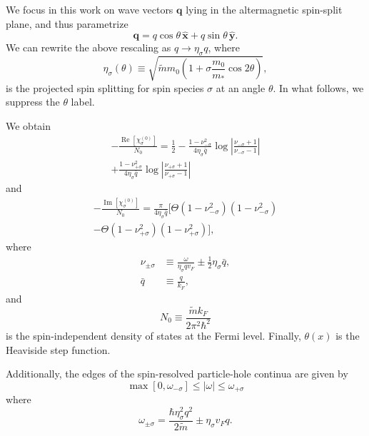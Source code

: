 \documentclass[aps,prb,reprint,twocolumns,superscriptaddress,nofootinbib]{revtex4-2}
\DeclareMathOperator{\Imm}{Im}
\DeclareMathOperator{\Ree}{Re}
\newcommand{\mdos}{\tilde{m}}
\newcommand{\kF}{k_{F}}
\begin{document}
	
	We focus in this work on wave vectors $\bm q$ lying in the altermagnetic spin-split plane, and thus parametrize
	\begin{equation}
		\bm q = q\cos\theta\,\hat{\bm x} + q\sin\theta\,\hat{\bm y}.
	\end{equation}
	We can  rewrite the above rescaling as $q\rightarrow \eta_\sigma q$, where
	\begin{equation}
		\eta_{\sigma}(\theta) \equiv \sqrt{\mdos m_0\left( 1+\sigma \frac{m_0}{m_*}\cos2\theta\right)} \label{eq:sigma},
	\end{equation}
	is the projected spin splitting for spin species $\sigma$ at an angle $\theta$. In what follows, we suppress the $\theta$ label.
	
	We obtain
	\begin{multline}
		-\frac{\Ree[\chi_\sigma^{(0)}]}{N_0} = \frac{1}{2}-\frac{1-\nu_{-\sigma}^2}{4\eta_\sigma \bar q}\log\left|\frac{\nu_{-\sigma}+1}{\nu_{-\sigma}-1}\right|\\+\frac{1-\nu_{+\sigma}^2}{4\eta_\sigma \bar q}\log\left|\frac{\nu_{+\sigma}+1}{\nu_{+\sigma}-1}\right| \label{eq:rechi0}
	\end{multline}
	and
	\begin{multline}
		-\frac{\Imm[\chi_\sigma^{(0)}]}{N_0} = \frac{\pi }{4\eta_\sigma \bar q}\Bigr[\Theta(1-\nu_{-\sigma}^2)(1-\nu_{-\sigma}^2)\\
		-\Theta(1-\nu_{+\sigma}^2)(1-\nu_{+\sigma}^2)\Bigr], \label{eq:imchi0}
	\end{multline}
	where 
	\begin{align}
		\nu_{\pm\sigma} &\equiv \frac{\omega}{\eta_\sigma qv_F} \pm \frac{1}{2}\eta_\sigma \bar q, \\
		\bar q &\equiv \frac{q}{\kF},	\end{align}
	and 
	\begin{equation}
		N_0 \equiv \frac{\mdos \kF}{2\pi^2\hbar^2}
	\end{equation}
	is the spin-independent density of states at the Fermi level. Finally, $\theta(x)$ is the Heaviside step function.
	
	Additionally, the edges of the spin-resolved particle-hole continua are given by 
	\begin{equation}
		\max[0,\omega_{-\sigma}] \leq |\omega| \leq \omega_{+\sigma} \label{eq:boundaries}
	\end{equation}
	where 
	\begin{equation}
		\omega_{\pm\sigma} = \frac{\hbar \eta_\sigma^2q^2}{2\mdos} \pm \eta_\sigma v_F q.\label{eq:omegapm}
	\end{equation}
\end{document}
